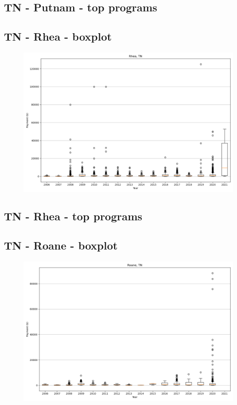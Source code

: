 \subsection*{TN - Putnam - top programs}

\newpage
\subsection*{TN - Rhea - boxplot}
\begin{figure}[h]
\centering
\includegraphics[width=7in]{../output/boxplots/counties/Rhea-TN_boxplot.png}
\end{figure}


\subsection*{TN - Rhea - top programs}

\newpage
\subsection*{TN - Roane - boxplot}
\begin{figure}[h]
\centering
\includegraphics[width=7in]{../output/boxplots/counties/Roane-TN_boxplot.png}
\end{figure}



